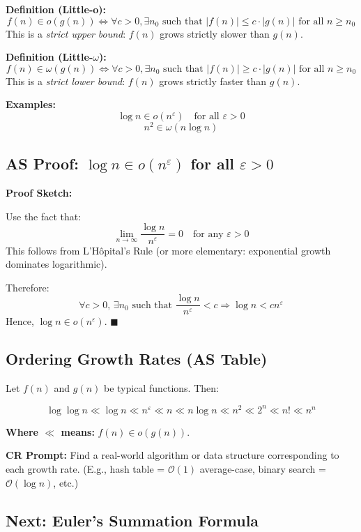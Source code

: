 \documentclass{article}
\begin{document}
\textbf{Definition (Little-o):}
\[
f(n) \in o(g(n)) \iff \forall c > 0, \exists n_0 \text{ such that } |f(n)| \le c \cdot |g(n)| \text{ for all } n \ge n_0
\]
This is a \textit{strict upper bound}: $f(n)$ grows strictly slower than $g(n)$.

\textbf{Definition (Little-$\omega$):}
\[
f(n) \in \omega(g(n)) \iff \forall c > 0, \exists n_0 \text{ such that } |f(n)| \ge c \cdot |g(n)| \text{ for all } n \ge n_0
\]
This is a \textit{strict lower bound}: $f(n)$ grows strictly faster than $g(n)$.

\textbf{Examples:}
\[
\log n \in o(n^\varepsilon) \quad \text{for all } \varepsilon > 0
\]
\[
n^2 \in \omega(n \log n)
\]

\subsection*{AS Proof: $\log n \in o(n^\varepsilon)$ for all $\varepsilon > 0$}

\textbf{Proof Sketch:}

Use the fact that:
\[
\lim_{n \to \infty} \frac{\log n}{n^\varepsilon} = 0 \quad \text{for any } \varepsilon > 0
\]
This follows from L'Hôpital's Rule (or more elementary: exponential growth dominates logarithmic).

Therefore:
\[
\forall c > 0,\, \exists n_0 \text{ such that } \frac{\log n}{n^\varepsilon} < c \Rightarrow \log n < c n^\varepsilon
\]
Hence, $\log n \in o(n^\varepsilon)$. $\blacksquare$

\subsection*{Ordering Growth Rates (AS Table)}

Let $f(n)$ and $g(n)$ be typical functions. Then:

\[
\log \log n \ll \log n \ll n^\varepsilon \ll n \ll n \log n \ll n^2 \ll 2^n \ll n! \ll n^n
\]

\textbf{Where $\ll$ means:} $f(n) \in o(g(n))$.

\textbf{CR Prompt:} Find a real-world algorithm or data structure corresponding to each growth rate. (E.g., hash table = $\mathcal{O}(1)$ average-case, binary search = $\mathcal{O}(\log n)$, etc.)

\subsection*{Next: Euler’s Summation Formula}
\end{document}
